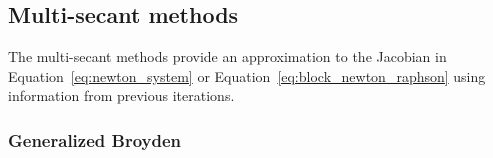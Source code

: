 
\subsection{Multi-secant methods}

The multi-secant methods provide an approximation to the Jacobian in Equation~\eqref{eq:newton_system} or Equation~\eqref{eq:block_newton_raphson} using information from previous iterations.


\subsubsection{Generalized Broyden}

